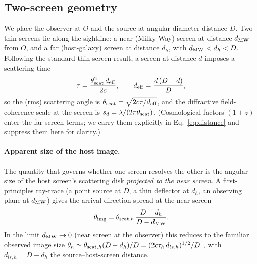 \subsection{Two-screen geometry}
\label{sec:geometry}

We place the observer at $O$ and the source at angular-diameter distance
$D$. Two thin screens lie along the sightline: a near (Milky Way) screen at
distance $d_{\rm MW}$ from $O$, and a far (host-galaxy) screen at distance
$d_{h}$, with $d_{\rm MW}<d_{h}<D$. Following the standard thin-screen
result, a screen at distance $d$ imposes a scattering time
%
\begin{equation}
\tau = \frac{\theta_{\rm scat}^{2}\,d_{\rm eff}}{2c},
\qquad
d_{\rm eff} = \frac{d\,(D-d)}{D},
\label{eq:tau}
\end{equation}
%
so the (rms) scattering angle is
$\theta_{\rm scat}=\sqrt{2c\tau/d_{\rm eff}}$, and the diffractive
field-coherence scale at the screen is
$s_{d}=\lambda/(2\pi\theta_{\rm scat})$. (Cosmological factors $(1+z)$ enter
the far-screen terms; we carry them explicitly in
Eq.~\ref{eq:distance} and suppress them here for clarity.)

\paragraph{Apparent size of the host image.}
The quantity that governs whether one screen resolves the other is the
angular size of the host screen's scattering disk \emph{projected to the
near screen}. A first-principles ray-trace (a point source at $D$, a thin
deflector at $d_{h}$, an observing plane at $d_{\rm MW}$) gives the
arrival-direction spread at the near screen
%
\begin{equation}
\theta_{\rm img}
  = \theta_{{\rm scat},h}\,\frac{D-d_{h}}{D-d_{\rm MW}} .
\label{eq:thimg}
\end{equation}
%
%
In the limit $d_{\rm MW}\to0$ (near screen at the observer) this reduces to
the familiar observed image size
$\theta_{h}\simeq\theta_{{\rm scat},h}(D-d_{h})/D
=(2c\tau_{h}\,d_{ls,h})^{1/2}/D$ \citep{Masui2015,Main2022}, with
$d_{ls,h}=D-d_{h}$ the source--host-screen distance.

